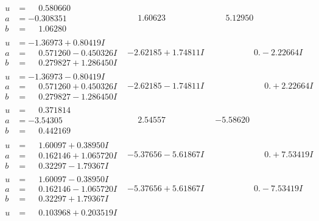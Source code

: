 \documentclass[1p]{elsarticle_modified}
\theoremstyle{definition}
\begin{document}
$$\begin{array}{c|c|c}
\begin{aligned}
u &= \phantom{-}0.580660\phantom{ +0.000000I} \\
a &= -0.308351\phantom{ +0.000000I} \\
b &= \phantom{-}1.06280\phantom{ +0.000000I}\end{aligned}
 & \phantom{-}1.60623\phantom{ +0.000000I} & \phantom{-}5.12950\phantom{ +0.000000I} \\ \hline\begin{aligned}
u &= -1.36973 + 0.80419 I \\
a &= \phantom{-}0.571260 - 0.450326 I \\
b &= \phantom{-}0.279827 + 1.286450 I\end{aligned}
 & -2.62185 + 1.74811 I & \phantom{-0.000000 } 0. - 2.22664 I \\ \hline\begin{aligned}
u &= -1.36973 - 0.80419 I \\
a &= \phantom{-}0.571260 + 0.450326 I \\
b &= \phantom{-}0.279827 - 1.286450 I\end{aligned}
 & -2.62185 - 1.74811 I & \phantom{-0.000000 -}0. + 2.22664 I \\ \hline\begin{aligned}
u &= \phantom{-}0.371814\phantom{ +0.000000I} \\
a &= -3.54305\phantom{ +0.000000I} \\
b &= \phantom{-}0.442169\phantom{ +0.000000I}\end{aligned}
 & \phantom{-}2.54557\phantom{ +0.000000I} & -5.58620\phantom{ +0.000000I} \\ \hline\begin{aligned}
u &= \phantom{-}1.60097 + 0.38950 I \\
a &= \phantom{-}0.162146 + 1.065720 I \\
b &= \phantom{-}0.32297 - 1.79367 I\end{aligned}
 & -5.37656 - 5.61867 I & \phantom{-0.000000 -}0. + 7.53419 I \\ \hline\begin{aligned}
u &= \phantom{-}1.60097 - 0.38950 I \\
a &= \phantom{-}0.162146 - 1.065720 I \\
b &= \phantom{-}0.32297 + 1.79367 I\end{aligned}
 & -5.37656 + 5.61867 I & \phantom{-0.000000 } 0. - 7.53419 I \\ \hline\begin{aligned}
u &= \phantom{-}0.103968 + 0.203519 I \\

\end{aligned}
\end{array}$$
\end{document}
